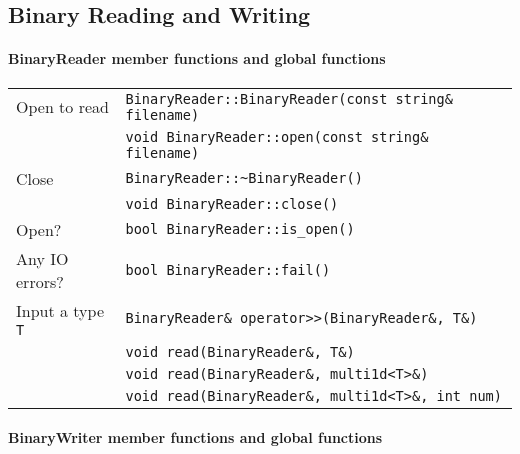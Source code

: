 \documentclass[12pt,letterpaper]{article}
\begin{document}
\newpage


\subsection{Binary Reading and Writing}
\label{sec:binaryio}

\paragraph{BinaryReader member functions and global functions}

\begin{flushleft}
  \begin{tabular}{|l|l|}
  \hline
  Open to read   & \verb|BinaryReader::BinaryReader(const string& filename)|\\
                 & \verb|void BinaryReader::open(const string& filename)|\\
  \hline
  Close          & \verb|BinaryReader::~BinaryReader()|\\
                 & \verb|void BinaryReader::close()|\\
  \hline
  Open?          & \verb|bool BinaryReader::is_open()| \\
  \hline
  Any IO errors? & \verb|bool BinaryReader::fail()| \\
  \hline
  Input a type \verb|T| & \verb|BinaryReader& operator>>(BinaryReader&, T&)| \\
                 & \verb|void read(BinaryReader&, T&)| \\
                 & \verb|void read(BinaryReader&, multi1d<T>&)| \\
                 & \verb|void read(BinaryReader&, multi1d<T>&, int num)| \\
  \hline
 \end{tabular}
\end{flushleft}

\paragraph{BinaryWriter member functions and global functions}
\end{document}

